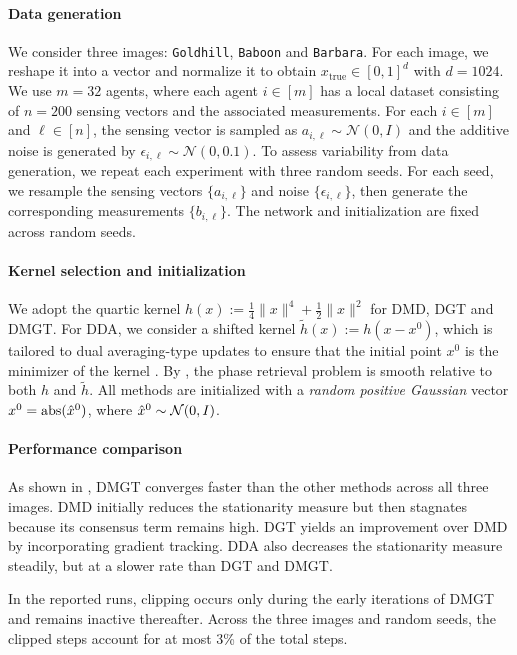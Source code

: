 \documentclass{article}
\theoremstyle{plain}
\theoremstyle{definition}
\theoremstyle{remark}
\begin{document}
\paragraph{Data generation} We consider three images: \texttt{Goldhill}, \texttt{Baboon} and \texttt{Barbara}. 
For each image, we reshape it into a vector and normalize it to obtain  $x_{\mathrm{true}}\in[0,1]^{d}$ with $d=1024$.
We use $m=32$ agents, where each agent $i\in[m]$ has a local dataset consisting of $n=200$ sensing vectors and the associated measurements.
For each $i\in[m]$ and $\ell\in[n]$, the sensing vector is sampled as $a_{i,\ell}\sim \mathcal{N}(0,I)$ and the additive noise is generated by $\epsilon_{i,\ell}\sim \mathcal{N}(0,0.1)$. %
To assess variability from data generation, we repeat each experiment with three random seeds. For each seed, we resample the sensing vectors $\{a_{i,\ell}\}$ and noise $\{\epsilon_{i,\ell}\}$, then generate the corresponding measurements $\{b_{i,\ell}\}$. The network and initialization are fixed across random seeds.

\paragraph{Kernel selection and initialization} We adopt the quartic kernel $h(x):=\frac{1}{4}\|x\|^4 + \frac12\|x\|^2$ for {\sf DMD}, {\sf DGT} and {\sf DMGT}. For {\sf DDA}, we consider a shifted kernel $\tilde h(x):=h(x-x^0)$, which is tailored to dual averaging-type updates to ensure that the initial point $x^0$ is the minimizer of the kernel \cite{liu2023rate}.  
By \cite[Lemma~5.1]{bolte2018first}, 
the phase retrieval problem is smooth 
relative to both $h$ and $\tilde h$.  All methods are initialized with a \emph{random positive Gaussian} vector $x^{0}={\rm abs}({\hat x^{0}})$, where $\hat x^{0}\sim{\cal N}(0,I)$.

\paragraph{Performance comparison}
As shown in , {\sf DMGT} converges faster than the other methods across all three images.
{\sf DMD} initially reduces the stationarity measure but then stagnates because its consensus term remains high.
{\sf DGT} yields an improvement over {\sf DMD} by incorporating gradient tracking.
{\sf DDA} also decreases the stationarity measure steadily, but at a slower rate than {\sf DGT} and {\sf DMGT}.

In the reported runs, clipping occurs only during the early iterations of {\sf DMGT} and remains inactive thereafter. Across the three images and random seeds, the clipped steps account for at most 3\% of the total steps.
\end{document}
